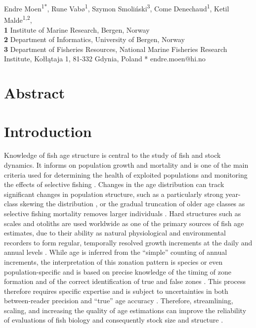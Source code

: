 \documentclass[10pt,letterpaper]{article}
\begin{document}
\vspace*{0.2in}

\begin{flushleft}
{\Large
\textbf{}
}
\newline


Endre Moen\textsuperscript{1*},
Rune Vabø\textsuperscript{1},
Szymon Smoliński\textsuperscript{3},
Come Denechaud\textsuperscript{1},
Ketil Malde\textsuperscript{1,2},
\\
\bigskip
\textbf{1} Institute of Marine Research, Bergen, Norway
\\
\textbf{2} Department of Informatics, University of Bergen, Norway
\\
\textbf{3} Department of Fisheries Resources, National Marine Fisheries Research Institute, Kołłątaja 1, 81-332 Gdynia, Poland
\bigskip
* endre.moen@hi.no

\end{flushleft}

\linenumbers

\section*{Abstract}




\section*{Introduction}

Knowledge of fish age structure is central to the study of fish and stock dynamics. It informs on population growth and mortality and is one of the main criteria used for determining the health of exploited populations and monitoring the effects of selective fishing \citep{Hidalgo, Brunel}. Changes in the age distribution can track significant changes in population structure, such as a particularly strong year-class skewing the distribution \citep{Reglero}, or the gradual truncation of older age classes as selective fishing mortality removes larger individuals \citep{Siskey}.
Hard structures such as scales and otoliths are used worldwide as one of the primary sources of fish age estimates, due to their ability as natural physiological and environmental recorders to form regular, temporally resolved growth increments at the daily and annual levels \citep{campana2001accuracy, Francis, Albuquerque}. While age is inferred from the “simple” counting of annual increments, the interpretation of this zonation pattern is species or even population-specific \citep{Hoeie} and is based on precise knowledge of the timing of zone formation and of the correct identification of true and false zones \citep{Panfili}. This process therefore requires specific expertise and is subject to uncertainties in both between-reader precision and “true” age accuracy \citep{Francis}. Therefore, streamlining, scaling, and increasing the quality of age estimations can improve the reliability of evaluations of fish biology and consequently stock size and structure \citep{Tyler, Beamish, Ragonese}. 
\end{document}
